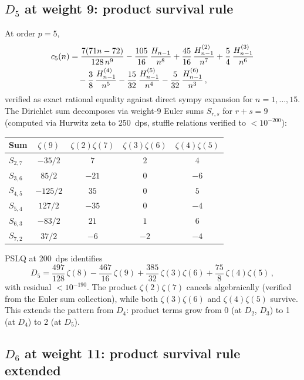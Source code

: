 \documentclass[11pt]{article}
\begin{document}
\subsection{$D_5$ at weight 9: product survival rule}

At order $p = 5$,
\begin{align}
  c_5(n) &= \frac{7(71n - 72)}{128\,n^9}
    - \frac{105}{16}\,\frac{H_{n-1}}{n^8}
    + \frac{45}{16}\,\frac{H_{n-1}^{(2)}}{n^7}
    + \frac{5}{4}\,\frac{H_{n-1}^{(3)}}{n^6}
    \notag \\
    &\quad - \frac{3}{8}\,\frac{H_{n-1}^{(4)}}{n^5}
    - \frac{15}{32}\,\frac{H_{n-1}^{(5)}}{n^4}
    - \frac{5}{32}\,\frac{H_{n-1}^{(6)}}{n^3}\,,
\end{align}
verified as exact rational equality against direct sympy expansion for
$n = 1, \ldots, 15$.
The Dirichlet sum decomposes via weight-9 Euler sums
$S_{r,s}$ for $r + s = 9$ (computed via Hurwitz zeta to 250~dps,
stuffle relations verified to $< 10^{-200}$):
\begin{center}
\begin{tabular}{lcccc}
\hline
Sum & $\zeta(9)$ & $\zeta(2)\zeta(7)$ & $\zeta(3)\zeta(6)$ & $\zeta(4)\zeta(5)$ \\
\hline
$S_{2,7}$ & $-35/2$ & $7$ & $2$ & $4$ \\
$S_{3,6}$ & $85/2$ & $-21$ & $0$ & $-6$ \\
$S_{4,5}$ & $-125/2$ & $35$ & $0$ & $5$ \\
$S_{5,4}$ & $127/2$ & $-35$ & $0$ & $-4$ \\
$S_{6,3}$ & $-83/2$ & $21$ & $1$ & $6$ \\
$S_{7,2}$ & $37/2$ & $-6$ & $-2$ & $-4$ \\
\hline
\end{tabular}
\end{center}
PSLQ at 200~dps identifies
\begin{equation}
\label{eq:D5_decomp}
  D_5 = \frac{497}{128}\,\zeta(8)
  - \frac{467}{16}\,\zeta(9)
  + \frac{385}{32}\,\zeta(3)\zeta(6)
  + \frac{75}{8}\,\zeta(4)\zeta(5)\,,
\end{equation}
with residual $< 10^{-190}$.  The product $\zeta(2)\zeta(7)$ cancels
algebraically (verified from the Euler sum collection), while both
$\zeta(3)\zeta(6)$ and $\zeta(4)\zeta(5)$ survive.  This extends the
pattern from $D_4$: product terms grow from 0 (at $D_2$, $D_3$) to 1
(at $D_4$) to 2 (at $D_5$).

\subsection{$D_6$ at weight 11: product survival rule extended}
\end{document}
